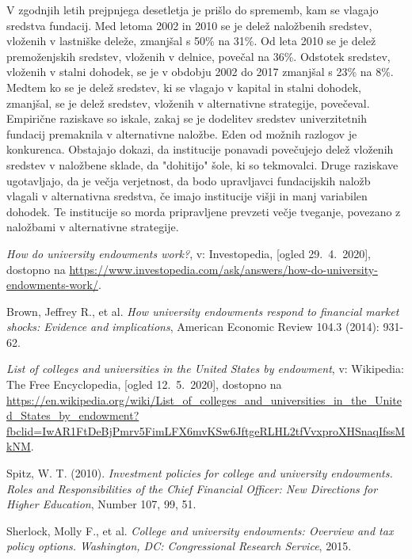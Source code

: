 \documentclass[12pt, a4paper]{article}
\begin{document}
V zgodnjih letih prejpnjega desetletja je prišlo do sprememb, kam se vlagajo sredstva fundacij. Med letoma 2002 in 2010 se je delež naložbenih sredstev, vloženih v lastniške deleže, zmanjšal s 50\% na 31\%. Od leta 2010 se je delež premoženjskih sredstev, vloženih v delnice, povečal na 36\%. Odstotek sredstev, vloženih v stalni dohodek, se je v obdobju 2002 do 2017 zmanjšal s 23\% na 8\%. Medtem ko se je delež sredstev, ki se vlagajo v kapital in stalni dohodek, zmanjšal, se je delež sredstev, vloženih v alternativne strategije, povečeval. Empirične raziskave so iskale, zakaj se je dodelitev sredstev univerzitetnih fundacij premaknila v alternativne naložbe. Eden od možnih razlogov je konkurenca. Obstajajo dokazi, da institucije ponavadi povečujejo delež vloženih sredstev v naložbene sklade, da "dohitijo" šole, ki so tekmovalci. Druge raziskave ugotavljajo, da je večja verjetnost, da bodo upravljavci fundacijskih naložb vlagali v alternativna sredstva, če imajo institucije višji in manj variabilen dohodek. Te institucije so morda pripravljene prevzeti večje tveganje, povezano z naložbami v alternativne strategije.\cite{investment2}

\newpage
\begin{thebibliography}{99}

\emph{How do university endowments work?}, v: Investopedia, [ogled 29.~4.~2020], dostopno na \url{https://www.investopedia.com/ask/answers/how-do-university-endowments-work/}.

Brown, Jeffrey R., et al. \emph{How university endowments respond to financial market shocks: Evidence and implications}, American Economic Review 104.3 (2014): 931-62.

\emph{List of colleges and universities in the United States by endowment},  v: Wikipedia: The Free Encyclopedia, [ogled 12.~5.~2020], dostopno na \url{https://en.wikipedia.org/wiki/List_of_colleges_and_universities_in_the_United_States_by_endowment?fbclid=IwAR1FtDeBjPmrv5FimLFX6mvKSw6JftgeRLHL2tfVvxproXHSnaqIfssMkNM}.

Spitz, W. T. (2010). \emph{Investment policies for college and university endowments. Roles and Responsibilities of the Chief Financial Officer: New Directions for Higher Education}, Number 107, 99, 51.

Sherlock, Molly F., et al. \emph{College and university endowments: Overview and tax policy options. Washington, DC: Congressional Research Service}, 2015.
\end{thebibliography}
\end{document}
